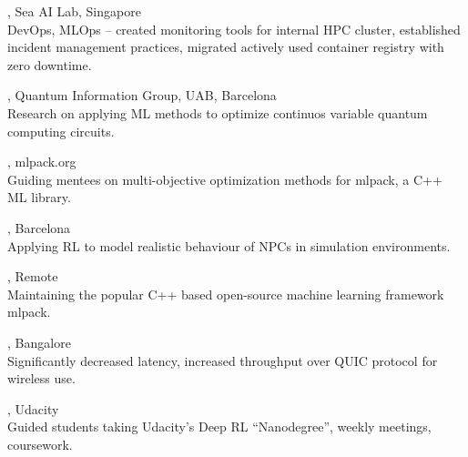 \documentclass[mm]{simple_style}
\begin{document}
\begin{resume}
, Sea AI Lab, Singapore \\
DevOps, MLOps -- created monitoring tools for internal HPC cluster, established incident management practices, migrated actively used container registry with zero downtime.\\

\vspace{-4.5ex}

, Quantum Information Group, UAB, Barcelona \\
Research on applying ML methods to optimize continuos variable quantum computing circuits.\\

\vspace{-4.5ex}

, mlpack.org \\
Guiding mentees on multi-objective optimization methods for mlpack, a C++ ML library.\\

\vspace{-4.5ex}

, Barcelona \\
Applying RL to model realistic behaviour of NPCs in simulation environments.\\

\vspace{-4.5ex}

, Remote \\
Maintaining the popular C++ based open-source machine learning framework mlpack.\\

\vspace{-4.5ex}

, Bangalore \\
Significantly decreased latency, increased throughput over QUIC protocol for wireless use.\\

\vspace{-4.5ex}

, Udacity \\
Guided students taking Udacity's Deep RL ``Nanodegree'', weekly meetings, coursework.\\


\end{resume}
\end{document}
